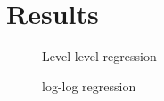 
\section{Results}
\begin{figure}[!htbp]
\caption{Level-level regression}
\centering

\end{figure}
%
\begin{figure}[!htbp]
\caption{log-log regression}
\centering

\end{figure}









